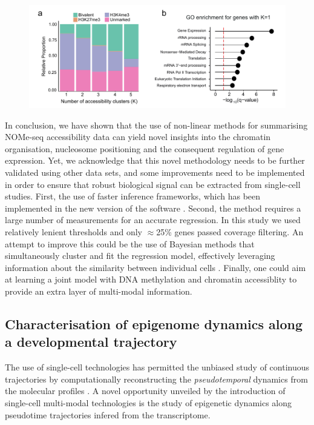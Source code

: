 \begin{figure}[H]
	\centering
	\includegraphics[width=0.9\linewidth]{scNMT_profiles_clusters2}
	\caption[]{}
	\label{fig:scnmt_profiles_clusters2}
\end{figure}





In conclusion, we have shown that the use of non-linear methods for summarising NOMe-seq accessibility data can yield novel insights into the chromatin organisation, nucleosome positioning and the consequent regulation of gene expression. Yet, we acknowledge that this novel methodology needs to be further validated using other data sets, and some improvements need to be implemented in order to ensure that robust biological signal can be extracted from single-cell studies. First, the use of faster inference frameworks, which has been implemented in the new version of the software \cite{Kapourani2018}. Second, the method requires a large number of measurements for an accurate regression. In this study we used relatively lenient thresholds and only $\approx$25\% genes passed coverage filtering. An attempt to improve this could be the use of Bayesian methods that simultaneously cluster and fit the regression model, effectively leveraging information about the similarity between individual cells \cite{Kapourani2018b}. Finally, one could aim at learning a joint model with DNA methylation and chromatin accessiblity to provide an extra layer of multi-modal information.


\subsection{Characterisation of epigenome dynamics along a developmental trajectory}
The use of single-cell technologies has permitted the unbiased study of continuous trajectories by computationally reconstructing the \textit{pseudotemporal} dynamics from the molecular profiles \cite{Trapnell2014,Haghverdi2016,Saelens2018}. A novel opportunity unveiled by the introduction of single-cell multi-modal technologies is the study of epigenetic dynamics along pseudotime trajectories infered from the transcriptome.\\

